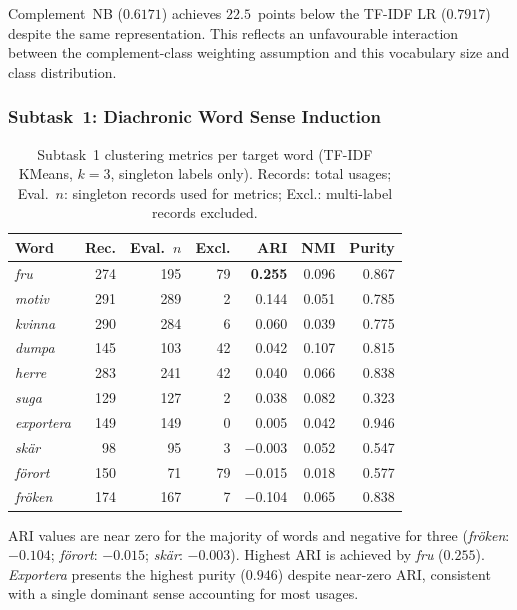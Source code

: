 Complement~NB ($0.6171$) achieves $22.5$~points below the TF-IDF LR ($0.7917$)
despite the same representation.  This reflects an unfavourable interaction
between the complement-class weighting assumption and this vocabulary size
and class distribution.

\subsubsection{Subtask~1: Diachronic Word Sense Induction}

\begin{table}[H]
\centering
\caption{Subtask~1 clustering metrics per target word (TF-IDF KMeans,
  $k=3$, singleton labels only). Records: total usages; Eval.~$n$: singleton
  records used for metrics; Excl.: multi-label records excluded.}
\label{tab:subtask1}
\small
\begin{tabular}{lrrrrrr}
\toprule
\textbf{Word} & \textbf{Rec.} & \textbf{Eval.~$n$} & \textbf{Excl.} & \textbf{ARI} & \textbf{NMI} & \textbf{Purity} \\
\midrule
\emph{fru}        & 274 & 195 & 79 & \textbf{0.255} & 0.096 & 0.867 \\
\emph{motiv}      & 291 & 289 &  2 & 0.144          & 0.051 & 0.785 \\
\emph{kvinna}     & 290 & 284 &  6 & 0.060          & 0.039 & 0.775 \\
\emph{dumpa}      & 145 & 103 & 42 & 0.042          & 0.107 & 0.815 \\
\emph{herre}      & 283 & 241 & 42 & 0.040          & 0.066 & 0.838 \\
\emph{suga}       & 129 & 127 &  2 & 0.038          & 0.082 & 0.323 \\
\emph{exportera}  & 149 & 149 &  0 & 0.005          & 0.042 & 0.946 \\
\emph{sk\"{a}r}  &  98 &  95 &  3 & $-$0.003       & 0.052 & 0.547 \\
\emph{f\"{o}rort} & 150 &  71 & 79 & $-$0.015       & 0.018 & 0.577 \\
\emph{fr\"{o}ken} & 174 & 167 &  7 & $-$0.104       & 0.065 & 0.838 \\
\bottomrule
\end{tabular}
\end{table}

ARI values are near zero for the majority of words and negative for three
(\emph{fr\"{o}ken}: $-0.104$; \emph{f\"{o}rort}: $-0.015$;
\emph{sk\"{a}r}: $-0.003$).  Highest ARI is achieved by \emph{fru} ($0.255$).
\emph{Exportera} presents the highest purity ($0.946$) despite near-zero ARI,
consistent with a single dominant sense accounting for most usages.

